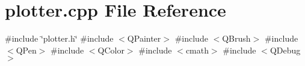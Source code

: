 \section{plotter.\+cpp File Reference}
\label{plotter_8cpp}
{\ttfamily \#include \char`\"{}plotter.\+h\char`\"{}}\newline
{\ttfamily \#include $<$Q\+Painter$>$}\newline
{\ttfamily \#include $<$Q\+Brush$>$}\newline
{\ttfamily \#include $<$Q\+Pen$>$}\newline
{\ttfamily \#include $<$Q\+Color$>$}\newline
{\ttfamily \#include $<$cmath$>$}\newline
{\ttfamily \#include $<$Q\+Debug$>$}\newline
